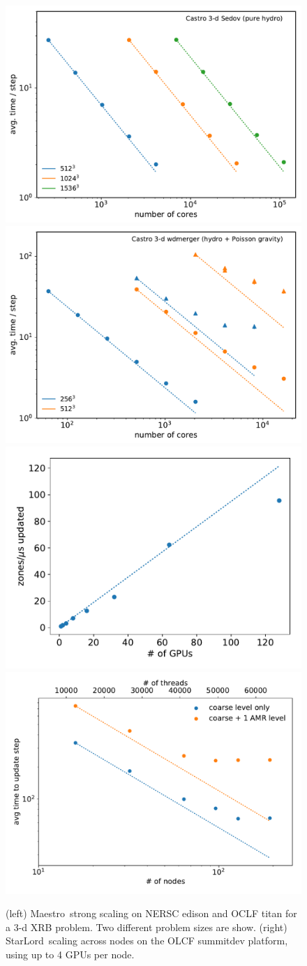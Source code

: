 \documentclass[letterpaper]{jpconf}
\newcommand{\maestro}{{\sffamily Maestro}}
\newcommand{\starlord}{{\sffamily StarLord}}
\begin{document}
\begin{figure}[t]
\includegraphics[width=0.48\linewidth]{sedov_scaling}
\includegraphics[width=0.48\linewidth]{wdmerger_scaling} \\
\includegraphics[width=0.48\linewidth]{summitdev_scaling}
\includegraphics[width=0.48\linewidth]{cori_scaling}
\caption{\label{fig:scaling} (left) \maestro\ strong scaling on NERSC edison
and OCLF titan for a 3-d XRB problem.  Two different problem sizes are show.
(right) \starlord\ scaling across nodes on the OLCF summitdev platform, using
up to 4 GPUs per node.}
\end{figure}
\end{document}
